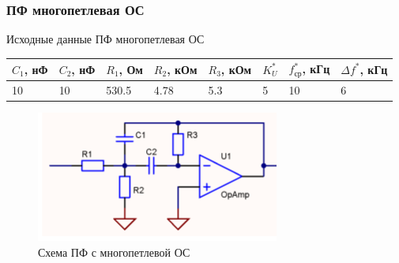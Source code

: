 \documentclass[a4paper, 12pt]{article}
\begin{document}
    \subsubsection{ПФ многопетлевая ОС}
    Исходные данные ПФ многопетлевая ОС
    \begin{center}
        \begin{tabular}{ | m{3.5em} | m{3.5em}| m{3.5em} | m{4em} | m{4em} | m{2.5em} | m{4em} | m{4.5em} |} 
        \hline
        $C_1$, нФ&$C_2$, нФ&$R_1$, Ом&$R_2$, кОм&$R_3$, кОм&$K_U^*$&$f_\text{ср}^*$, кГц &$\Delta f^*$, кГц\\ 
        \hline
        10&10&530.5&4.78&5.3&5&10&6\\ 
        \hline
        \end{tabular}
    \end{center}
    \begin{figure}[H]
        \centering
        \includegraphics{strip_multi.png}
        \captionsetup{skip=0pt}
        \caption{Схема ПФ с многопетлевой ОС}
        \label{fig:null_scheme4}
    \end{figure}
\end{document}

